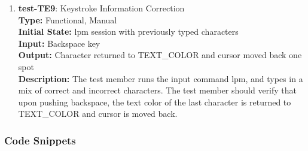 \documentclass[12pt, titlepage]{article}
\begin{document}
\begin{enumerate}
\color{red}
\item{\textbf{test-TE9}: Keystroke Information Correction\\}
\textbf{Type:} Functional, Manual \\
\textbf{Initial State:} lpm session with previously typed characters \\
\textbf{Input:} Backspace key\\
\textbf{Output:} Character returned to TEXT\_COLOR and cursor moved back one spot \\
\textbf{Description:} The test member runs the input command lpm, and types in a mix of correct and incorrect characters. The test member should verify that upon pushing backspace, the text color of the last character is returned to TEXT\_COLOR and cursor is moved back. \\
\end{enumerate}

\subsubsection{Code Snippets}
\end{document}
